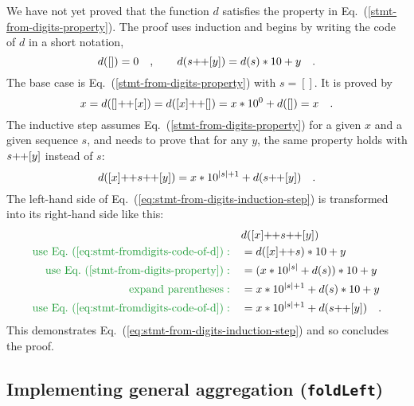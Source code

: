 We have not yet proved that the function $d$ satisfies the property
in Eq.~(\ref{stmt-from-digits-property}). The proof uses induction
and begins by writing the code of $d$ in a short notation,
\begin{equation}
d(\left[\right])=0\quad,\quad\quad d(s\negmedspace+\negthickspace+[y])=d(s)*10+y\quad.\label{eq:stmt-fromdigits-code-of-d}
\end{equation}
The base case is Eq.~(\ref{stmt-from-digits-property}) with $s=[]$.
It is proved by
\[
x=d([]\negmedspace+\negthickspace+[x])=d([x]\negmedspace+\negthickspace+[])=x*10^{0}+d(\left[\right])=x\quad.
\]
The inductive step assumes Eq.~(\ref{stmt-from-digits-property})
for a given $x$ and a given sequence $s$, and needs to prove that
for any $y$, the same property holds with $s\negmedspace+\negthickspace+[y]$
instead of $s$:
\begin{equation}
d([x]\negmedspace+\negthickspace+s\negmedspace+\negthickspace+[y])=x*10^{\left|s\right|+1}+d(s\negmedspace+\negthickspace+[y])\quad.\label{eq:stmt-from-digits-induction-step}
\end{equation}
The left-hand side of Eq.~(\ref{eq:stmt-from-digits-induction-step})
is transformed into its right-hand side like this:
\begin{align*}
 & d([x]\negmedspace+\negthickspace+s\negmedspace+\negthickspace+[y])\\
{\color{greenunder}\text{use Eq.~(\ref{eq:stmt-fromdigits-code-of-d})}:}\quad & =d([x]\negmedspace+\negthickspace+s)*10+y\\
{\color{greenunder}\text{use Eq.~(\ref{stmt-from-digits-property})}:}\quad & =(x*10^{\left|s\right|}+d(s))*10+y\\
{\color{greenunder}\text{expand parentheses}:}\quad & =x*10^{\left|s\right|+1}+d(s)*10+y\\
{\color{greenunder}\text{use Eq.~(\ref{eq:stmt-fromdigits-code-of-d})}:}\quad & =x*10^{\left|s\right|+1}+d(s\negmedspace+\negthickspace+[y])\quad.
\end{align*}
This demonstrates Eq.~(\ref{eq:stmt-from-digits-induction-step})
and so concludes the proof.

\subsection{Implementing general aggregation (\texttt{foldLeft})\label{subsec:implementing-general-aggregation-foldleft}}

